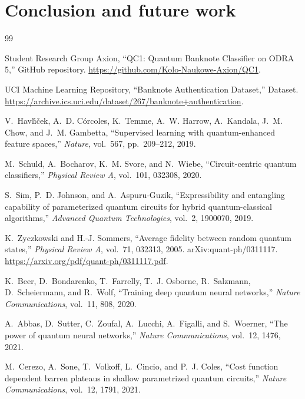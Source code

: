 \documentclass[11pt]{article}
\begin{document}
\section{Conclusion and future work}



\begin{thebibliography}{99}

Student Research Group Axion,
\newblock ``QC1: Quantum Banknote Classifier on ODRA 5,''
\newblock GitHub repository.
\newblock \url{https://github.com/Kolo-Naukowe-Axion/QC1}.

UCI Machine Learning Repository,
\newblock ``Banknote Authentication Dataset,''
\newblock Dataset.
\newblock \url{https://archive.ics.uci.edu/dataset/267/banknote+authentication}.

V.~Havl\'{\i}\v{c}ek, A.~D. C\'orcoles, K.~Temme, A.~W. Harrow, A.~Kandala, J.~M. Chow, and J.~M. Gambetta,
\newblock ``Supervised learning with quantum-enhanced feature spaces,''
\newblock \emph{Nature}, vol.~567, pp.~209--212, 2019.

M.~Schuld, A.~Bocharov, K.~M. Svore, and N.~Wiebe,
\newblock ``Circuit-centric quantum classifiers,''
\newblock \emph{Physical Review A}, vol.~101, 032308, 2020.

S.~Sim, P.~D. Johnson, and A.~Aspuru-Guzik,
\newblock ``Expressibility and entangling capability of parameterized quantum circuits for hybrid quantum-classical algorithms,''
\newblock \emph{Advanced Quantum Technologies}, vol.~2, 1900070, 2019.

K.~Zyczkowski and H.-J. Sommers,
\newblock ``Average fidelity between random quantum states,''
\newblock \emph{Physical Review A}, vol.~71, 032313, 2005.
\newblock arXiv:quant-ph/0311117.
\newblock \url{https://arxiv.org/pdf/quant-ph/0311117.pdf}.

K.~Beer, D.~Bondarenko, T.~Farrelly, T.~J. Osborne, R.~Salzmann, D.~Scheiermann, and R.~Wolf,
\newblock ``Training deep quantum neural networks,''
\newblock \emph{Nature Communications}, vol.~11, 808, 2020.

A.~Abbas, D.~Sutter, C.~Zoufal, A.~Lucchi, A.~Figalli, and S.~Woerner,
\newblock ``The power of quantum neural networks,''
\newblock \emph{Nature Communications}, vol.~12, 1476, 2021.

M.~Cerezo, A.~Sone, T.~Volkoff, L.~Cincio, and P.~J. Coles,
\newblock ``Cost function dependent barren plateaus in shallow parametrized quantum circuits,''
\newblock \emph{Nature Communications}, vol.~12, 1791, 2021.


\end{thebibliography}
\end{document}

